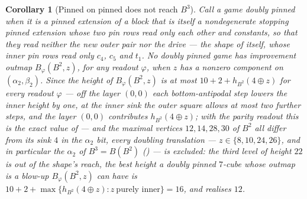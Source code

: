 \documentclass[11pt]{article}
\theoremstyle{plain}
\newtheorem{corollary}[theorem]{Corollary}
\theoremstyle{definition}
\begin{document}
\begin{corollary}[Pinned on pinned does not reach $B^{3}$]\label{cor:pinned-no-doubling}
Call a game \emph{doubly pinned} when it is a pinned extension of a block
that is itself a nondegenerate stopping pinned extension whose two pin
rows read only each other and constants, so that they read neither the
new outer pair nor the drive --- the shape of  itself,
whose inner pin rows read only $c_4$, $c_5$ and $t_1$. No doubly
pinned game has improvement outmap $B_\varphi(B^{2},z)$, for any readout
$\varphi$, when $z$ has a nonzero component on $(\alpha_2,\beta_2)$. Since
the height of $B_\varphi(B^{2},z)$ is at most $10+2+h_{B^{2}}(4\oplus z)$
for every readout $\varphi$ --- off the layer $(0,0)$ each
bottom-antipodal step lowers the inner height by one, at the inner sink
the outer square allows at most two further steps, and the layer $(0,0)$
contributes $h_{B^{2}}(4\oplus z)$; with the parity readout this is the
exact value of  --- and the maximal vertices $12,14,28,30$ of
$B^{2}$ all differ from its sink $4$ in the $\alpha_2$ bit, every doubling
translation --- $z\in\{8,10,24,26\}$, and in particular the $\alpha_2$ of
$B^{3}=B(B^{2})$ () --- is excluded: the third
level of height $22$ is out of the shape's reach, the best height a doubly
pinned $7$-cube whose outmap is a blow-up $B_\varphi(B^{2},z)$ can have is
$10+2+\max\{h_{B^{2}}(4\oplus z):z\ \text{purely inner}\}=16$, and
 realises $12$.
\end{corollary}
\end{document}
